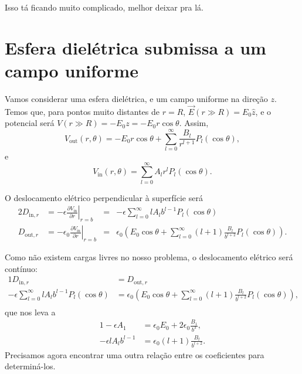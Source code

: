 \documentclass{article}
\begin{document}
{\color{red}Isso tá ficando muito complicado, melhor deixar pra lá.}

\section{Esfera dielétrica submissa a um campo uniforme}
Vamos considerar uma esfera dielétrica, e um campo uniforme na direção $z$. Temos que, para pontos muito distantes de $r = R$,
$\vec{E}(r\gg R) = E_0 \hat{z}$, e o potencial será $V(r\gg R) = - E_0 z = - E_0 r \cos{\theta}$. Assim,
\begin{equation}
 V_{\mathrm{out}}(r,\theta) = - E_0 r \cos{\theta} + \sum_{l = 0}^{\infty} \frac{B_l}{r^{l+1}} P_l(\cos{\theta})\mathrm{,}
\end{equation}
e
\begin{equation}
 V_{\mathrm{in}}(r,\theta) = \sum_{l = 0}^{\infty} A_l r^l P_l(\cos{\theta})\mathrm{.}
\end{equation}

O deslocamento elétrico perpendicular à superfície será
\begin{alignat}{2}
 D_{\mathrm{in},r} &= \left. - \epsilon \frac{\partial V_{\mathrm{in}}}{\partial r} \right\rvert_{r=b} &=&
 -\epsilon \sum_{l=0}^{\infty} l A_l b^{l-1} P_l(\cos{\theta})\\
 D_{\mathrm{out},r} &= \left. - \epsilon_0 \frac{\partial V_{\mathrm{in}}}{\partial r} \right\rvert_{r=b} &=&
 \epsilon_0 \left( E_0 \cos{\theta} + \sum_{l=0}^{\infty} (l+1)\frac{B_l}{b^{l+2}} P_l(\cos{\theta}) \right)\mathrm{.}
\end{alignat}

Como não existem cargas livres no nosso problema, o deslocamento elétrico será contínuo:
\begin{alignat}{1}
 D_{\mathrm{in},r} &= D_{\mathrm{out},r} \\
 -\epsilon \sum_{l=0}^{\infty} l A_l b^{l-1} P_l(\cos{\theta}) &= 
 \epsilon_0 \left( E_0 \cos{\theta} + \sum_{l=0}^{\infty} (l+1)\frac{B_l}{b^{l+2}} P_l(\cos{\theta}) \right)\mathrm{,}\\
\end{alignat}
que nos leva a
\begin{alignat}{1}
 -\epsilon A_1 &= \epsilon_0 E_0 + 2 \epsilon_0\frac{B_1}{b^3}\mathrm{,}\\
 -\epsilon l A_l b^{l-1} &= \epsilon_0(l+1)\frac{B_l}{b^{l+2}}\mathrm{.}
\end{alignat}
Precisamos agora encontrar uma outra relação entre os coeficientes para determiná-los.
\end{document}
